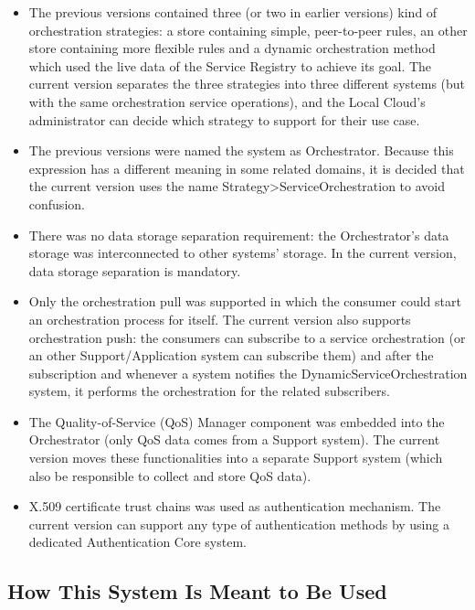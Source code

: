\documentclass[a4paper]{arrowhead}
\begin{document}
\begin{itemize}
    \item The previous versions contained three (or two in earlier versions) kind of orchestration strategies: a store containing simple, peer-to-peer rules, an other store containing more flexible rules and a dynamic orchestration method which used the live data of the Service Registry to achieve its goal. The current version separates the three strategies into three different systems (but with the same orchestration service operations), and the Local Cloud's administrator can decide which strategy to support for their use case.
    \item The previous versions were named the system as Orchestrator. Because this expression has a different meaning in some related domains, it is decided that the current version uses the name \newline {\textless}Strategy{\textgreater}ServiceOrchestration to avoid confusion.
    \item There was no data storage separation requirement: the Orchestrator's data storage was interconnected to other systems' storage. In the current version, data storage separation is mandatory.
    \item Only the orchestration pull was supported in which the consumer could start an orchestration process for itself. The current version also supports orchestration push: the consumers can subscribe to a service orchestration (or an other Support/Application system can subscribe them) and after the subscription and whenever a system notifies the DynamicServiceOrchestration system, it performs the orchestration for the related subscribers.
    \item The Quality-of-Service (QoS) Manager component was embedded into the Orchestrator (only QoS data comes from a Support system). The current version moves these functionalities into a separate Support system (which also be responsible to collect and store QoS data).
    \item X.509 certificate trust chains was used as authentication mechanism. The current version can support any type of authentication methods by using a dedicated Authentication Core system. 
\end{itemize}

\subsection{How This System Is Meant to Be Used}
\label{sec:use}
\end{document}
